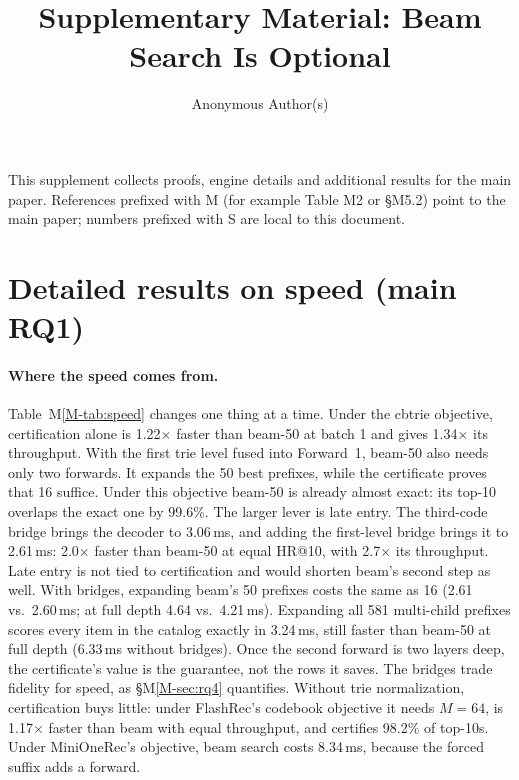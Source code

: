 \documentclass[sigconf,anonymous]{acmart}
\begin{document}
\title{Supplementary Material: Beam Search Is Optional}
\author{Anonymous Author(s)}
\maketitle
\renewcommand{\thesection}{S\arabic{section}}\renewcommand{\thetable}{S\arabic{table}}\renewcommand{\thefigure}{S\arabic{figure}}
\noindent This supplement collects proofs, engine details and additional results for the main paper. References
prefixed with M (for example Table M2 or \S M5.2) point to the main paper; numbers prefixed with S are local to
this document.

\section{Detailed results on speed (main RQ1)}
\paragraph{Where the speed comes from.} Table~M\ref{M-tab:speed} changes one thing at a time. Under the cbtrie
objective, certification alone is 1.22$\times$ faster than beam-50 at batch 1 and gives 1.34$\times$ its
throughput. With the first trie level fused into Forward~1, beam-50 also needs only two forwards. It expands the
50 best prefixes, while the certificate proves that 16 suffice. Under this objective beam-50 is already almost
exact: its top-10 overlaps the exact one by 99.6\%. The larger lever is late entry. The third-code bridge brings
the decoder to 3.06\,ms, and adding the first-level bridge brings it to 2.61\,ms: 2.0$\times$ faster than beam-50 at
equal HR@10, with 2.7$\times$ its throughput. Late entry is not tied to certification and would shorten beam's
second step as well. With bridges, expanding beam's 50 prefixes costs the same as 16 (2.61 vs.\ 2.60\,ms; at
full depth 4.64 vs.\ 4.21\,ms). Expanding all 581 multi-child prefixes scores every item in the catalog exactly
in 3.24\,ms, still faster than beam-50 at full depth (6.33\,ms without bridges). Once the second forward is two
layers deep, the certificate's value is the guarantee, not the rows it saves. The bridges trade fidelity for
speed, as \S M\ref{M-sec:rq4} quantifies. Without trie normalization, certification buys little:
under FlashRec's codebook objective it needs $M=64$, is 1.17$\times$ faster than beam with equal throughput, and
certifies 98.2\% of top-10s. Under MiniOneRec's objective, beam search costs 8.34\,ms, because the forced suffix
adds a forward.
\end{document}
